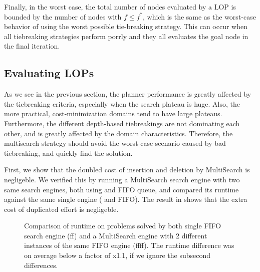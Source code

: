 
Finally, in the worst case, the total number of nodes evaluated by a LOP is bounded by the number of nodes with $f \leq f^*$, which is the same as the worst-case behavior of \astar using the worst possible tie-breaking strategy.
This can occur  when all tiebreaking
strategies perform porrly  and they all evaluates the goal node in the
final iteration.

\subsection{Evaluating LOPs}

As we see in the previous section, the planner performance is greatly
affected by the tiebreaking criteria, especially when the search plateau
is huge.
% 
Also, the more practical, cost-minimization domains tend to have large plateaus.
% 
Furthermore, the different depth-based tiebreakings are not dominating
each other, and is greatly affected by the domain characteristics.
% 
Therefore, the multisearch strategy should avoid the
worst-case scenario caused by bad tiebreaking, and quickly find the solution.

First, we show that the doubled cost of insertion and deletion by
MultiSearch is negligeble.  We verified this by running a MultiSearch
search engine with two same search engines, both using \lmcut and FIFO
queue, and compared its runtime against the same single engine (\lmcut
and FIFO). The result in  shows that the extra cost of
duplicated effort is negligeble.

\begin{figure}[htb]
 \centering
 \caption{Comparison of runtime on problems solved by both single FIFO search engine (ff) and a MultiSearch engine with 2 different instances of the same FIFO engine (ffff). The runtime difference was on average below a factor of x1.1, if we ignore the subsecond differences.}
 \label{ffff}
\end{figure}

